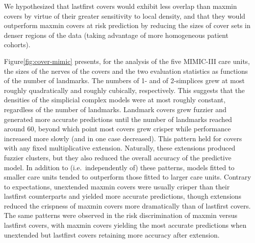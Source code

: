 \documentclass[
]{article}
\begin{document}
We hypothesized that lastfirst covers would exhibit less overlap than
maxmin covers by virtue of their greater sensitivity to local density,
and that they would outperform maxmin covers at risk prediction by
reducing the sizes of cover sets in denser regions of the data (taking
advantage of more homogeneous patient cohorts).

Figure\nbs\ref{fig:cover-mimic} presents, for the analysis of the five
MIMIC-III care units, the sizes of the nerves of the covers and the two
evaluation statistics as functions of the number of landmarks. The
numbers of 1- and of 2-simplices grew at most roughly quadratically and
roughly cubically, respectively. This suggests that the densities of the
simplicial complex models were at most roughly constant, regardless of
the number of landmarks. Landmark covers grew fuzzier and generated more
accurate predictions until the number of landmarks reached around 60,
beyond which point most covers grew crisper while performance increased
more slowly (and in one case decreased). This pattern held for covers
with any fixed multiplicative extension. Naturally, these extensions
produced fuzzier clusters, but they also reduced the overall accuracy of
the predictive model. In addition to (i.e.~independently of) these
patterns, models fitted to smaller care units tended to outperform those
fitted to larger care units. Contrary to expectations, unextended maxmin
covers were usually crisper than their lastfirst counterparts and
yielded more accurate predictions, though extensions reduced the
crispness of maxmin covers more dramatically than of lastfirst covers.
The same patterns were observed in the risk discrimination of maxmin
versus lastfirst covers, with maxmin covers yielding the most accurate
predictions when unextended but lastfirst covers retaining more accuracy
after extension.
\end{document}
